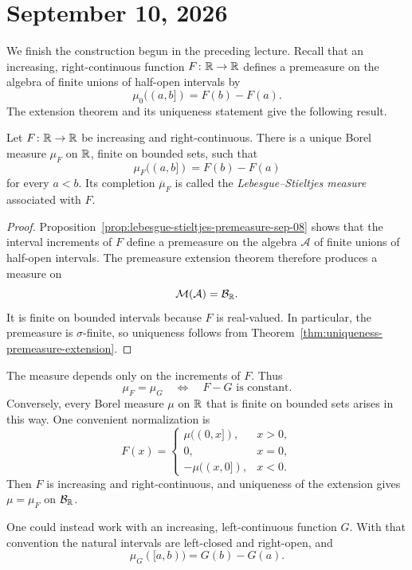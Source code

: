 \section{September 10, 2026}

We finish the construction begun in the preceding lecture. Recall that
an increasing, right-continuous function $F\colon\mathbb{R}\to\mathbb{R}$
defines a premeasure on the algebra of finite unions of half-open
intervals by
\[
  \mu_0((a,b])=F(b)-F(a).
\]
The extension theorem and its uniqueness statement give the following
result.

\begin{theorem}
  \label{thm:lebesgue-stieltjes-measure-sep-10}
  Let $F\colon\mathbb{R}\to\mathbb{R}$ be increasing and right-continuous.
  There is a unique Borel measure $\mu_F$ on $\mathbb{R}$, finite on bounded
  sets, such that
  \[
    \mu_F((a,b])=F(b)-F(a)
  \]
  for every $a<b$. Its completion $\overline{\mu}_F$ is called the
  \emph{Lebesgue--Stieltjes measure} associated with $F$.
\end{theorem}

\begin{proof}
  Proposition~\ref{prop:lebesgue-stieltjes-premeasure-sep-08} shows that
  the interval increments of $F$ define a premeasure on the algebra
  $\mathcal A$ of finite unions of half-open intervals. The premeasure
  extension theorem therefore produces a measure on
  \[
    \mathcal M(\mathcal A)=\mathcal B_{\mathbb{R}}.
  \]
  It is finite on bounded intervals because $F$ is real-valued. In
  particular, the premeasure is $\sigma$-finite, so uniqueness follows
  from Theorem~\ref{thm:uniqueness-premeasure-extension}.
\end{proof}

The measure depends only on the increments of $F$. Thus
\[
  \mu_F=\mu_G
  \quad\Longleftrightarrow\quad
  F-G\text{ is constant}.
\]
Conversely, every Borel measure $\mu$ on $\mathbb{R}$ that is finite on
bounded sets arises in this way. One convenient normalization is
\[
  F(x)=
  \begin{cases}
    \mu((0,x]),&x>0,\\
    0,&x=0,\\
    -\mu((x,0]),&x<0.
  \end{cases}
\]
Then $F$ is increasing and right-continuous, and uniqueness of the
extension gives $\mu=\mu_F$ on $\mathcal B_{\mathbb{R}}$.

One could instead work with an increasing, left-continuous function
$G$. With that convention the natural intervals are left-closed and
right-open, and
\[
  \mu_G([a,b))=G(b)-G(a).
\]

